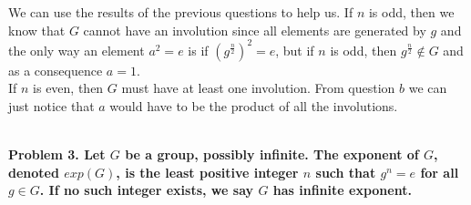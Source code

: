 \documentclass[20pt]{article}
\begin{document}
\begin{text}
    We can use the results of the previous questions to help us. If $n$ is odd, then we know that $G$ cannot have an involution since all elements are generated by $g$ and the only way an element $a^2 = e$ is if $(g^{\frac{n}{2}})^2 = e$, but if $n$ is odd, then $g^{\frac{n}{2}} \notin G$ and as a consequence $a = 1$.\\
    
    If $n$ is even, then $G$ must have at least one involution. From question $b$ we can just notice that $a$ would have to be the product of all the involutions.
\end{text}\\

\noindent
\textbf{Problem 3. Let $G$ be a group, possibly infinite. The exponent of $G$, denoted $exp(G)$, is the least positive integer $n$ such that $g^n = e$ for all $g \in G$. If no such integer exists, we say $G$ has infinite exponent.}\\
\end{document}
